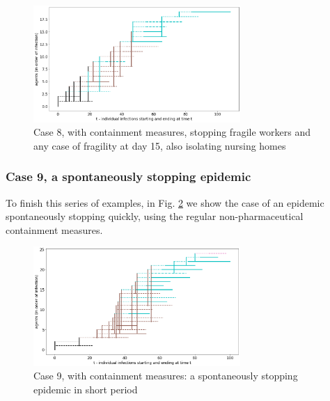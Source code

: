 \documentclass[graybox]{svmult}
\begin{document}
\begin{figure}[t]
\begin{center}
\includegraphics[width=0.7\textwidth]{withShort1B.png}%
\caption{Case 8, with containment measures, stopping fragile workers and any case of fragility at day 15, also isolating nursing homes}
\label{1B}
\end{center}
\end{figure}


\subsubsection{Case 9, a spontaneously stopping epidemic}
\label{c9}

To finish this series of examples, in Fig. \ref{2} we show the case of an epidemic spontaneously stopping quickly, using the regular non-pharmaceutical containment measures.

\begin{figure}[t]
\begin{center}
\includegraphics[width=0.7\textwidth]{withShort2.png}%
\caption{Case 9, with containment measures: a spontaneously stopping epidemic in  short period}
\label{2}
\end{center}
\end{figure}
\end{document}
